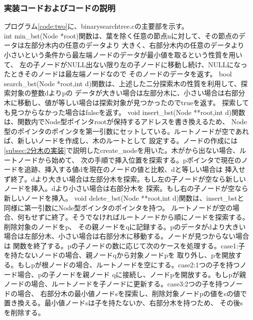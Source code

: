 \documentclass{ltjsarticle}
\begin{document}
\subsubsection{実装コードおよびコードの説明}\label{subsubsec:実装コードおよびコードの説明2}
プログラム\ref{code:two}に、binarysearchtree.cの主要部を示す。\\ \indent
int min\_bst(Node *root)関数は、葉を除く任意の節点nに対して、その節点のデータは左部分木内の任意のデータより
大きく、右部分木内の任意のデータより小さいという条件から最左端ノードのデータが最小値を取るという性質を用いて、
左の子ノードがNULL出ない限り左の子ノードに移動し続け、NULLになったときそのノードは最左端ノードなので
そのノードのデータを返す。
bool search\_bst(Node *root,int d)関数は、上述した二分探索木の性質を利用して、探索対象の整数dよりpの
データが大きい場合は左部分木に、小さい場合は右部分木に移動し、値が等しい場合は探索対象が見つかったのでtrueを返す。
探索しても見つからなかった場合はfalseを返す。
void insert\_bst(Node **root,int d)関数は、関数内でNode型ポインタrootが保持するアドレスを書き換えるため、
Node型のポインタのポインタを第一引数にセットしている。ルートノードが空であれば、新しいノードを作成し、木のルートとして
設定する。ノードの作成には\ref{subsec:2分木の実装}で説明したcreate\_nodeを用いた。木がから出ない場合、ルートノードから始めて、
次の手順で挿入位置を探索する。pポインタで現在のノードを追跡、挿入する値dを現在のノードの値と比較、dと等しい場合は
挿入せず終了。dより大きい場合は左部分木を探索。もし左の子ノードが空なら新しいノードを挿入。dより小さい場合は右部分木を
探索。もし右の子ノードが空なら新しいノードを挿入。
void delete\_bst(Node **root,int d)関数は、insert\_bstと同様に第一引数にNode型ポインタのポインタを持つ。
ルートノードが空の場合、何もせずに終了。そうでなければルートノードから順にノードを探索する。削除対象のノードをp、
その親ノードをqに記録する。pのデータがdより大きい場合は左部分木、小さい場合は右部分木に移動する。ノードが見つからない場合は
関数を終了する。pの子ノードの数に応じて次のケースを処理する。case1:子を持たないノードの場合、親ノードqから対象ノードpを
取り外し、pを開放する。もしpが根ノードの場合、ルートノードを空にする。case2:1つの子を持つノード場合、pの子ノードを親ノード
qに接続し、ノードpを開放する。もしpが親ノードの場合、ルートノードを子ノードに更新する。case3:2つの子を持つノードの場合、
右部分木の最小値ノードsを探索し、削除対象ノードpの値をsの値で置き換える。最小値ノードsは子を持たないか、右部分木を持つため、
その後sを削除する。
\end{document}
